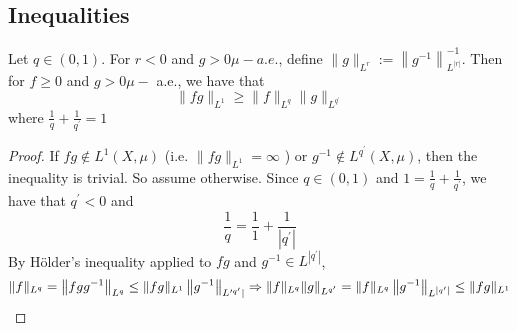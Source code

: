 \subsection{Inequalities}
\begin{proposition}
    Let $q \in(0,1) .$ For $r<0$ and $g>0 \mu-a . e .$, define $\|g\|_{L^{r}}:=\left\|g^{-1}\right\|_{L^{|r|}}^{-1}$. Then for $f \geq 0$ and $g>0 \mu-$ a.e., we have that
    \[
        \|f g\|_{L^{1}} \geq\|f\|_{L^{q}}\|g\|_{L^{q^{\prime}}}
    \]
    where $\frac{1}{q}+\frac{1}{q^{\prime}}=1$
\end{proposition}
\begin{proof}
    If $f g \notin L^{1}(X, \mu)$ (i.e. $\|f g\|_{L^{1}}=\infty$ ) or $g^{-1} \notin L^{q^{\prime}}(X, \mu)$, then the inequality is trivial. So assume otherwise. Since $q \in(0,1)$ and $1=\frac{1}{q}+\frac{1}{q^{\prime}}$, we have that $q^{\prime}<0$ and
    \[
        \frac{1}{q}=\frac{1}{1}+\frac{1}{\left|q^{\prime}\right|}
    \]
    By Hölder's inequality applied to $f g$ and $g^{-1} \in L^{\left|q^{\prime}\right|}$,
    \[
        \|f\|_{L^{q}}=\left\|f g g^{-1}\right\|_{L^{q}} \leq\|f g\|_{L^{1}}\left\|g^{-1}\right\|_{L^{\prime q^{\prime}} \mid} \Rightarrow\|f\|_{L^{q}}\|g\|_{L^{q^{\prime}}}=\|f\|_{L^{q}}\left\|g^{-1}\right\|_{L^{\left|q^{\prime}\right|}} \leq\|f g\|_{L^{1}}\qedhere
    \]
\end{proof}

